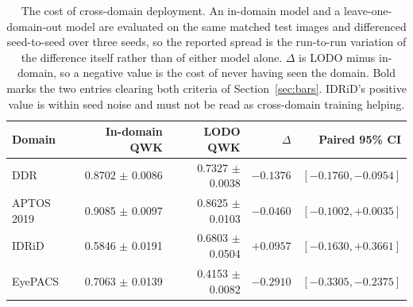 \begin{table}[t]
\centering
\caption{The cost of cross-domain deployment. An in-domain model and a leave-one-domain-out model are evaluated on the same matched test images and differenced seed-to-seed over three seeds, so the reported spread is the run-to-run variation of the difference itself rather than of either model alone. $\Delta$ is LODO minus in-domain, so a negative value is the cost of never having seen the domain. Bold marks the two entries clearing both criteria of Section~\ref{sec:bars}. IDRiD's positive value is within seed noise and must not be read as cross-domain training helping.}
\label{tab:deployment}
\begin{tabular}{lrrrr}
\toprule
Domain & In-domain QWK & LODO QWK & $\Delta$ & Paired 95\% CI \\
\midrule
DDR & 0.8702 $\pm$ 0.0086 & 0.7327 $\pm$ 0.0038 & $\mathbf{-0.1376}$ & $[-0.1760, -0.0954]$ \\
APTOS 2019 & 0.9085 $\pm$ 0.0097 & 0.8625 $\pm$ 0.0103 & $-0.0460$ & $[-0.1002, +0.0035]$ \\
IDRiD & 0.5846 $\pm$ 0.0191 & 0.6803 $\pm$ 0.0504 & $+0.0957$ & $[-0.1630, +0.3661]$ \\
EyePACS & 0.7063 $\pm$ 0.0139 & 0.4153 $\pm$ 0.0082 & $\mathbf{-0.2910}$ & $[-0.3305, -0.2375]$ \\
\bottomrule
\end{tabular}
\end{table}
